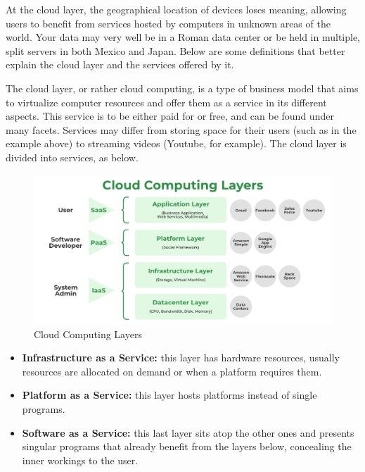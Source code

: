 \documentclass[11pt]{article}
\begin{document}
At the cloud layer, the geographical location of devices loses meaning, allowing users to benefit from services hosted by computers in unknown areas of the world. Your data may very well be in a Roman data center or be held in multiple, split servers in both Mexico and Japan. Below are some definitions that better explain the cloud layer and the services offered by it. \par \vspace{0.5 cm}

The cloud layer, or rather cloud computing, is a type of business model that aims to virtualize computer resources and offer them as a service in its different aspects. This service is to be either paid for or free, and can be found under many facets. Services may differ from storing space for their users (such as in the example above) to streaming videos (Youtube, for example). The cloud layer is divided into services, as below. \par \vspace{0.5 cm}

\begin{figure}[ht]
    \centering
    \includegraphics[scale = 0.4]{Cloud Computing Layers.png}
    \caption{Cloud Computing Layers}
    \label{fig:Cloud Computing Layers}
\end{figure}

\begin{itemize}
    \item \textbf{Infrastructure as a Service:} this layer has hardware resources, usually resources are allocated on demand or when a platform requires them.
    \item \textbf{Platform as a Service:} this layer hosts platforms instead of single programs. 
    \item \textbf{Software as a Service:} this last layer sits atop the other ones and presents singular programs that already benefit from the layers below, concealing the inner workings to the user. 
\end{itemize}
\end{document}

